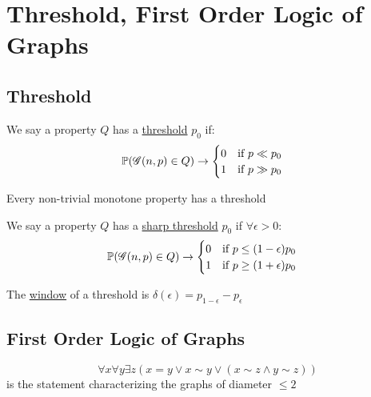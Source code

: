 \section{Threshold, First Order Logic of Graphs}

\subsection{Threshold}
\begin{definition}
    We say a property $Q$ has a \ul{threshold} $p_0$ if:
    \begin{equation*}
        \operatorname{\mathbb{P}}(\operatorname{\mathscr{G}}(n, p) \in Q) \rightarrow 
        \begin{cases}
            0 \quad \text{if $p \ll p_0$} \\
            1 \quad \text{if $p \gg p_0$}    
        \end{cases}
    \end{equation*}
\end{definition}

\begin{theorem}
    Every non-trivial monotone property has a threshold
\end{theorem}

\begin{definition}
    We say a property $Q$ has a \ul{sharp threshold} $p_0$ if $\forall \epsilon > 0$:
    \begin{equation*}
        \operatorname{\mathbb{P}}(\operatorname{\mathscr{G}}(n, p) \in Q) \rightarrow 
        \begin{cases}
            0 \quad \text{if $p \leq (1 - \epsilon)p_0$} \\
            1 \quad \text{if $p \geq (1 + \epsilon)p_0$}    
        \end{cases}
    \end{equation*}
\end{definition}

\begin{definition}
    The \ul{window} of a threshold is $\delta(\epsilon) = p_{1 - \epsilon} - p_{\epsilon}$
\end{definition}

\subsection{First Order Logic of Graphs}
\begin{example}\label{lec3:diameter-two}
    \begin{equation*}
        \forall x \forall y \exists z \left(x = y \vee x \sim y \vee \left(x \sim z \wedge y \sim z\right)\right)
    \end{equation*}
    is the statement characterizing the graphs of diameter $\leq 2$
\end{example}

